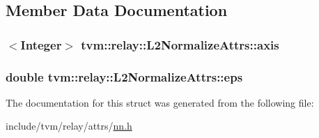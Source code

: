 \subsection{Member Data Documentation}
\subsubsection[{\texorpdfstring{axis}{axis}}]{$<${\bf Integer}$>$ tvm\+::relay\+::\+L2\+Normalize\+Attrs\+::axis}\hypertarget{structtvm_1_1relay_1_1L2NormalizeAttrs_aad8f5d98e39e09ac544a4546c56a298a}{}\label{structtvm_1_1relay_1_1L2NormalizeAttrs_aad8f5d98e39e09ac544a4546c56a298a}
\subsubsection[{\texorpdfstring{eps}{eps}}]{\setlength{\rightskip}{0pt plus 5cm}double tvm\+::relay\+::\+L2\+Normalize\+Attrs\+::eps}\hypertarget{structtvm_1_1relay_1_1L2NormalizeAttrs_a0294037efdb6353d27885b93370c8a54}{}\label{structtvm_1_1relay_1_1L2NormalizeAttrs_a0294037efdb6353d27885b93370c8a54}


The documentation for this struct was generated from the following file\+:\begin{DoxyCompactItemize}
\item 
include/tvm/relay/attrs/\hyperlink{include_2tvm_2relay_2attrs_2nn_8h}{nn.\+h}\end{DoxyCompactItemize}
